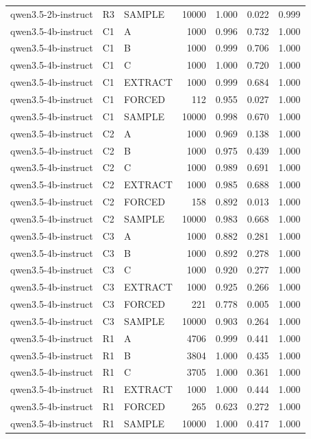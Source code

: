 \begin{table}
\begin{tabular}{lllrrrr}
qwen3.5-2b-instruct & R3 & SAMPLE & 10000 & 1.000 & 0.022 & 0.999 \\
qwen3.5-4b-instruct & C1 & A & 1000 & 0.996 & 0.732 & 1.000 \\
qwen3.5-4b-instruct & C1 & B & 1000 & 0.999 & 0.706 & 1.000 \\
qwen3.5-4b-instruct & C1 & C & 1000 & 1.000 & 0.720 & 1.000 \\
qwen3.5-4b-instruct & C1 & EXTRACT & 1000 & 0.999 & 0.684 & 1.000 \\
qwen3.5-4b-instruct & C1 & FORCED & 112 & 0.955 & 0.027 & 1.000 \\
qwen3.5-4b-instruct & C1 & SAMPLE & 10000 & 0.998 & 0.670 & 1.000 \\
qwen3.5-4b-instruct & C2 & A & 1000 & 0.969 & 0.138 & 1.000 \\
qwen3.5-4b-instruct & C2 & B & 1000 & 0.975 & 0.439 & 1.000 \\
qwen3.5-4b-instruct & C2 & C & 1000 & 0.989 & 0.691 & 1.000 \\
qwen3.5-4b-instruct & C2 & EXTRACT & 1000 & 0.985 & 0.688 & 1.000 \\
qwen3.5-4b-instruct & C2 & FORCED & 158 & 0.892 & 0.013 & 1.000 \\
qwen3.5-4b-instruct & C2 & SAMPLE & 10000 & 0.983 & 0.668 & 1.000 \\
qwen3.5-4b-instruct & C3 & A & 1000 & 0.882 & 0.281 & 1.000 \\
qwen3.5-4b-instruct & C3 & B & 1000 & 0.892 & 0.278 & 1.000 \\
qwen3.5-4b-instruct & C3 & C & 1000 & 0.920 & 0.277 & 1.000 \\
qwen3.5-4b-instruct & C3 & EXTRACT & 1000 & 0.925 & 0.266 & 1.000 \\
qwen3.5-4b-instruct & C3 & FORCED & 221 & 0.778 & 0.005 & 1.000 \\
qwen3.5-4b-instruct & C3 & SAMPLE & 10000 & 0.903 & 0.264 & 1.000 \\
qwen3.5-4b-instruct & R1 & A & 4706 & 0.999 & 0.441 & 1.000 \\
qwen3.5-4b-instruct & R1 & B & 3804 & 1.000 & 0.435 & 1.000 \\
qwen3.5-4b-instruct & R1 & C & 3705 & 1.000 & 0.361 & 1.000 \\
qwen3.5-4b-instruct & R1 & EXTRACT & 1000 & 1.000 & 0.444 & 1.000 \\
qwen3.5-4b-instruct & R1 & FORCED & 265 & 0.623 & 0.272 & 1.000 \\
qwen3.5-4b-instruct & R1 & SAMPLE & 10000 & 1.000 & 0.417 & 1.000 \\

\end{tabular}
\end{table}
